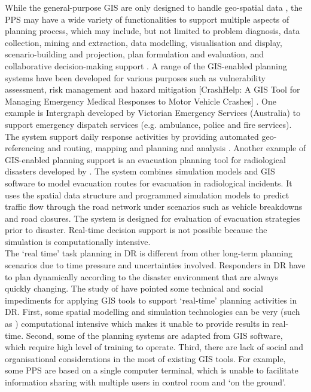 While the general-purpose GIS  are only designed to handle geo-spatial data \cite{Geertman2004}, the PPS may have a wide variety of functionalities to support multiple aspects of planning process, which may include, but not limited to problem diagnosis, data collection, mining and extraction, data modelling, visualisation and display, scenario-building and projection, plan formulation and evaluation, and collaborative decision-making support \cite{Geertman2004,Zerger2003}. A range of the GIS-enabled planning systems have been developed for various purposes such as  vulnerability assessment, risk management and hazard mitigation \cite{Cova1999} [CrashHelp: A GIS Tool for Managing Emergency Medical Responses to Motor Vehicle Crashes] . One example is Intergraph developed by Victorian Emergency Services (Australia) \cite{IntergraphCorporation2000}to support emergency dispatch services (e.g. ambulance, police and fire services). The system support daily response activities by providing automated geo-referencing and routing, mapping and planning and analysis \cite{Zerger2003}. Another example of GIS-enabled planning support is an evacuation planning tool for radiological disasters developed by \cite{Eglese1994}. The system combines simulation models and  GIS software to model evacuation routes for evacuation in radiological incidents.  It uses the spatial data structure and programmed simulation models to predict traffic flow through the road network under scenarios such as vehicle breakdowns and road closures. The system is designed for evaluation of evacuation strategies prior to disaster. Real-time decision support is not possible because the simulation is computationally intensive.\\

The `real time' task planning in DR is different from other long-term planning scenarios due to time pressure and uncertainties involved.  Responders in DR have to plan dynamically according to the disaster environment that are always quickly changing. The study of \cite{Zerger2003} have pointed some technical and social impediments for applying GIS tools to support `real-time' planning activities in DR. First, some spatial modelling and simulation technologies can be very (such as \cite{Eglese1994} ) computational intensive which makes it unable to provide results in real-time. Second, some of the planning systems are adapted from GIS software, which require high level of training to operate. Third, there are lack of social and organisational considerations in the most of existing GIS tools. For example, some PPS are based on a single computer terminal, which is unable to facilitate information sharing with multiple users in control room and `on the ground'. \\

